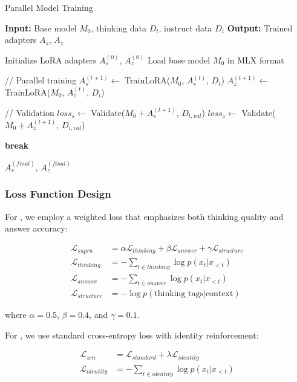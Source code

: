 \begin{algorithm}
\caption{Parallel Model Training}
\label{alg:training}
\begin{algorithmic}
\STATE \textbf{Input:} Base model $M_0$, thinking data $D_t$, instruct data $D_i$
\STATE \textbf{Output:} Trained adapters $A_s$, $A_z$

\STATE Initialize LoRA adapters $A_s^{(0)}$, $A_z^{(0)}$
\STATE Load base model $M_0$ in MLX format

    \STATE // Parallel training
    \STATE $A_s^{(t+1)} \leftarrow$ TrainLoRA($M_0$, $A_s^{(t)}$, $D_t$)
    \STATE $A_z^{(t+1)} \leftarrow$ TrainLoRA($M_0$, $A_z^{(t)}$, $D_i$)
    
    \STATE // Validation
        \STATE $loss_s \leftarrow$ Validate($M_0 + A_s^{(t+1)}$, $D_{t,val}$)
        \STATE $loss_z \leftarrow$ Validate($M_0 + A_z^{(t+1)}$, $D_{i,val}$)
        
            \STATE \textbf{break}
        \ENDIF
    \ENDIF
\ENDFOR

\RETURN $A_s^{(final)}$, $A_z^{(final)}$
\end{algorithmic}
\end{algorithm}

\subsubsection{Loss Function Design}

For \supra{}, we employ a weighted loss that emphasizes both thinking quality and answer accuracy:

\begin{align}
\mathcal{L}_{supra} &= \alpha \mathcal{L}_{thinking} + \beta \mathcal{L}_{answer} + \gamma \mathcal{L}_{structure} \\
\mathcal{L}_{thinking} &= -\sum_{t \in thinking} \log p(x_t | x_{<t}) \\
\mathcal{L}_{answer} &= -\sum_{t \in answer} \log p(x_t | x_{<t}) \\
\mathcal{L}_{structure} &= -\log p(\text{thinking\_tags} | \text{context})
\end{align}

where $\alpha = 0.5$, $\beta = 0.4$, and $\gamma = 0.1$.

For \zennano{}, we use standard cross-entropy loss with identity reinforcement:

\begin{align}
\mathcal{L}_{zen} &= \mathcal{L}_{standard} + \lambda \mathcal{L}_{identity} \\
\mathcal{L}_{identity} &= -\sum_{t \in identity} \log p(x_t | x_{<t})
\end{align}

